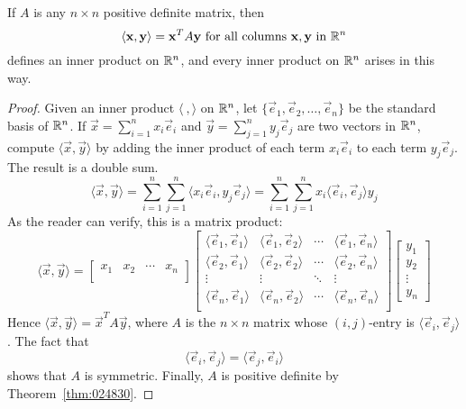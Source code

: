\documentclass{ximera}
\begin{document}
\begin{theorem}\label{thm:030372}
If $A$ is any $n \times n$ positive definite matrix, then
\begin{equation*}
\langle \mathbf{x}, \mathbf{y} \rangle = \mathbf{x}^TA\mathbf{y} \mbox{ for all columns } \mathbf{x}, \mathbf{y} \mbox{ in } \mathbb{R}^n
\end{equation*}
defines an inner product on $\mathbb{R}^n$, and every inner product on $\mathbb{R}^n$ arises in this way.
\end{theorem}

\begin{proof}
Given an inner product $\langle\ , \rangle$ on $\mathbb{R}^n$, let $\{\vec{e}_{1}, \vec{e}_{2}, \dots, \vec{e}_{n}\}$ be the standard basis of $\mathbb{R}^n$. If $\vec{x} = \displaystyle \sum_{i = 1}^{n} x_i\vec{e}_i$ and $\vec{y} = \displaystyle \sum_{j = 1}^{n} y_j\vec{e}_j$ are two vectors in $\mathbb{R}^n$, compute $\langle\vec{x}, \vec{y}\rangle$ by adding the inner product of each term $x_{i}\vec{e}_{i}$ to each term $y_{j}\vec{e}_{j}$. The result is a double sum.
\begin{equation*}
\langle \vec{x}, \vec{y} \rangle = \displaystyle \sum_{i = 1}^{n} \sum_{j = 1}^{n} \langle x_i \vec{e}_i, y_j\vec{e}_j \rangle =
\displaystyle \sum_{i = 1}^{n} \sum_{j = 1}^{n} x_i \langle \vec{e}_i, \vec{e}_j \rangle y_j
\end{equation*}
As the reader can verify, this is a matrix product:
\begin{equation*}
\langle \vec{x}, \vec{y} \rangle =
\left[ \begin{array}{cccc}
x_1 & x_2 & \cdots & x_n \\
\end{array} \right]
\left[ \begin{array}{cccc}
\langle \vec{e}_1, \vec{e}_1 \rangle & \langle \vec{e}_1, \vec{e}_2 \rangle & \cdots & \langle \vec{e}_1, \vec{e}_n \rangle \\
\langle \vec{e}_2, \vec{e}_1 \rangle & \langle \vec{e}_2, \vec{e}_2 \rangle & \cdots & \langle \vec{e}_2, \vec{e}_n \rangle \\
\vdots & \vdots & \ddots & \vdots \\
\langle \vec{e}_n, \vec{e}_1 \rangle & \langle \vec{e}_n, \vec{e}_2 \rangle & \cdots & \langle \vec{e}_n, \vec{e}_n \rangle \\
\end{array} \right]
\left[ \begin{array}{c}
	y_1 \\
	y_2 \\
	\vdots \\
	y_n
\end{array} \right]
\end{equation*}
Hence $\langle\vec{x}, \vec{y}\rangle = \vec{x}^{T}A\vec{y}$, where $A$ is the $n \times n$ matrix whose $(i, j)$-entry is $\langle\vec{e}_{i}, \vec{e}_{j} \rangle$. The fact that
\begin{equation*}
\langle\vec{e}_{i}, \vec{e}_{j}\rangle = \langle\vec{e}_{j}, \vec{e}_{i}\rangle\end{equation*}
shows that $A$ is symmetric. Finally, $A$ is positive definite by Theorem~\ref{thm:024830}.
\end{proof}
\end{document}

